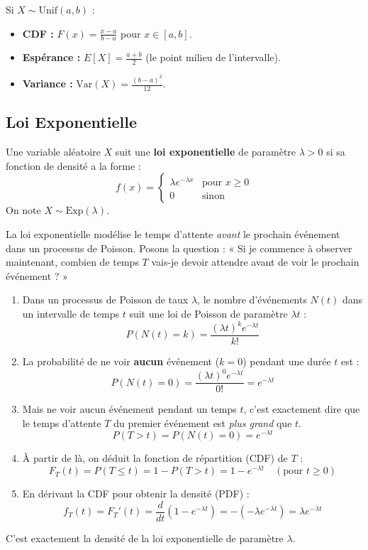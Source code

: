 \begin{theorembox}
Si $X \sim \text{Unif}(a, b)$ :
\begin{itemize}
    \item \textbf{CDF :} $F(x) = \frac{x-a}{b-a}$ pour $x \in [a, b]$.
    \item \textbf{Espérance :} $E[X] = \frac{a+b}{2}$ (le point milieu de l'intervalle).
    \item \textbf{Variance :} $\text{Var}(X) = \frac{(b-a)^2}{12}$.
\end{itemize}
\end{theorembox}

\subsection{Loi Exponentielle}

\begin{definitionbox}
Une variable aléatoire $X$ suit une \textbf{loi exponentielle} de paramètre $\lambda > 0$ si sa fonction de densité a la forme :
$$ f(x) = \begin{cases} \lambda e^{-\lambda x} & \text{pour } x \ge 0 \\ 0 & \text{sinon} \end{cases} $$
On note $X \sim \text{Exp}(\lambda)$.
\end{definitionbox}

\begin{intuitionbox}
La loi exponentielle modélise le temps d'attente \textit{avant} le prochain événement dans un processus de Poisson.
\newline
Posons la question : « Si je commence à observer maintenant, combien de temps $T$ vais-je devoir attendre avant de voir le prochain événement ? »
\begin{enumerate}
    \item Dans un processus de Poisson de taux $\lambda$, le nombre d'événements $N(t)$ dans un intervalle de temps $t$ suit une loi de Poisson de paramètre $\lambda t$ :
    $$ P(N(t)=k) = \frac{(\lambda t)^k e^{-\lambda t}}{k!} $$
    \item La probabilité de ne voir \textbf{aucun} événement ($k=0$) pendant une durée $t$ est :
    $$ P(N(t)=0) = \frac{(\lambda t)^0 e^{-\lambda t}}{0!} = e^{-\lambda t} $$
    \item Mais ne voir aucun événement pendant un temps $t$, c'est exactement dire que le temps d'attente $T$ du premier événement est \textit{plus grand} que $t$.
    $$ P(T > t) = P(N(t)=0) = e^{-\lambda t} $$
    \item À partir de là, on déduit la fonction de répartition (CDF) de $T$ :
    $$ F_T(t) = P(T \le t) = 1 - P(T > t) = 1 - e^{-\lambda t} \quad (\text{pour } t \ge 0) $$
    \item En dérivant la CDF pour obtenir la densité (PDF) :
    $$ f_T(t) = F_T'(t) = \frac{d}{dt}(1 - e^{-\lambda t}) = -(-\lambda e^{-\lambda t}) = \lambda e^{-\lambda t} $$
\end{enumerate}
C'est exactement la densité de la loi exponentielle de paramètre $\lambda$.
\end{intuitionbox}

